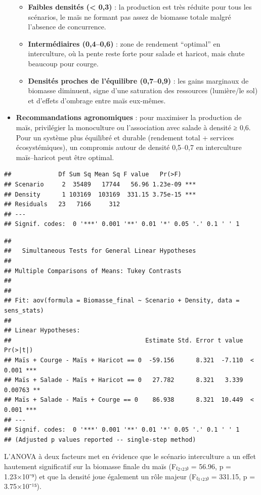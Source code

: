 \documentclass[
]{article}
\begin{document}
\begin{itemize}
  \begin{itemize}
  \item
    \textbf{Faibles densités (\textless{} 0,3)} : la production est très
    réduite pour tous les scénarios, le maïs ne formant pas assez de
    biomasse totale malgré l'absence de concurrence.
  \item
    \textbf{Intermédiaires (0,4--0,6)} : zone de rendement ``optimal''
    en interculture, où la pente reste forte pour salade et haricot,
    mais chute beaucoup pour courge.
  \item
    \textbf{Densités proches de l'équilibre (0,7--0,9)} : les gains
    marginaux de biomasse diminuent, signe d'une saturation des
    ressources (lumière/le sol) et d'effets d'ombrage entre maïs
    eux-mêmes.
  \end{itemize}
\item
  \textbf{Recommandations agronomiques} : pour maximiser la production
  de maïs, privilégier la monoculture ou l'association avec salade à
  densité ≥ 0,6. Pour un système plus équilibré et durable (rendement
  total + services écosystémiques), un compromis autour de densité
  0,5--0,7 en interculture maïs--haricot peut être optimal.
\end{itemize}

\begin{verbatim}
##             Df Sum Sq Mean Sq F value   Pr(>F)    
## Scenario     2  35489   17744   56.96 1.23e-09 ***
## Density      1 103169  103169  331.15 3.75e-15 ***
## Residuals   23   7166     312                     
## ---
## Signif. codes:  0 '***' 0.001 '**' 0.01 '*' 0.05 '.' 0.1 ' ' 1
\end{verbatim}

\begin{verbatim}
## 
##   Simultaneous Tests for General Linear Hypotheses
## 
## Multiple Comparisons of Means: Tukey Contrasts
## 
## 
## Fit: aov(formula = Biomasse_final ~ Scenario + Density, data = sens_stats)
## 
## Linear Hypotheses:
##                                     Estimate Std. Error t value Pr(>|t|)    
## Maïs + Courge - Maïs + Haricot == 0  -59.156      8.321  -7.110  < 0.001 ***
## Maïs + Salade - Maïs + Haricot == 0   27.782      8.321   3.339  0.00763 ** 
## Maïs + Salade - Maïs + Courge == 0    86.938      8.321  10.449  < 0.001 ***
## ---
## Signif. codes:  0 '***' 0.001 '**' 0.01 '*' 0.05 '.' 0.1 ' ' 1
## (Adjusted p values reported -- single-step method)
\end{verbatim}

L'ANOVA à deux facteurs met en évidence que le scénario interculture a
un effet hautement significatif sur la biomasse finale du maïs (F₍₂,₂₃₎
= 56.96, p = 1.23×10⁻⁹) et que la densité joue également un rôle majeur
(F₍₁,₂₃₎ = 331.15, p = 3.75×10⁻¹⁵).
\end{document}
